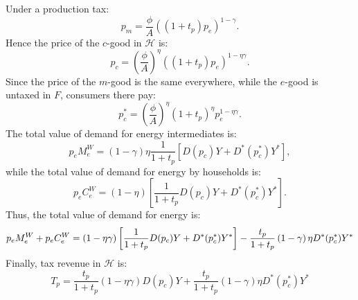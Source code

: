 \documentclass[notitlepage,12pt]{article}
\begin{document}
Under a production tax:%
\begin{equation*}
p_{m}=\frac{\phi }{A}\left( \left( 1+t_{p}\right) p_{e}\right) ^{1-\gamma }.
\end{equation*}%
Hence the price of the $c$-good in $\mathcal{H}$ is:%
\begin{equation*}
p_{c}=\left( \frac{\phi }{A}\right) ^{\eta }\left( \left( 1+t_{p}\right)
p_{e}\right) ^{1-\eta \gamma }.
\end{equation*}%
Since the price of the $m$-good is the same everywhere, while the $e$-good
is untaxed in $F$, consumers there pay:%
\begin{equation*}
p_{c}^{\ast }=\left( \frac{\phi }{A}\right) ^{\eta }\left( 1+t_{p}\right)
^{\eta }p_{e}^{1-\eta \gamma }.
\end{equation*}%
The total value of demand for energy intermediates is:%
\begin{equation*}
p_{e}M_{e}^{W}=\left( 1-\gamma \right) \eta \frac{1}{1+t_{p}}\left[
D(p_{c})Y+D^{\ast }(p_{c}^{\ast })Y^{\ast }\right] ,
\end{equation*}%
while the total value of demand for energy by households is:%
\begin{equation*}
p_{e}C_{e}^{W}=\left( 1-\eta \right) \left[ \frac{1}{1+t_{p}}%
D(p_{c})Y+D^{\ast }(p_{c}^{\ast })Y^{\ast }\right] .
\end{equation*}%
Thus, the total value of demand for energy is:%
\begin{equation*}
p_{e}M_{e}^{W}+p_{e}C_{e}^{W}=\left( 1-\eta \gamma \right) \left[ \frac{1}{%
1+t_{p}}D(p_{c})Y+D^{\ast }(p_{c}^{\ast })Y^{\ast }\right] -\frac{t_{p}}{%
1+t_{p}}\left( 1-\gamma \right) \eta D^{\ast }(p_{c}^{\ast })Y^{\ast }
\end{equation*}%
Finally, tax revenue in $\mathcal{H}$ is:%
\begin{equation*}
T_{p}=\frac{t_{p}}{1+t_{p}}\left( 1-\eta \gamma \right) D(p_{c})Y+\frac{t_{p}%
}{1+t_{p}}\left( 1-\gamma \right) \eta D^{\ast }(p_{c}^{\ast })Y^{\ast }
\end{equation*}
\end{document}

